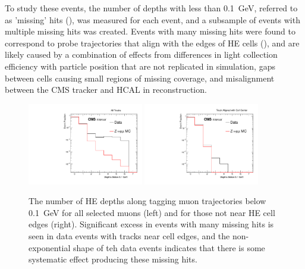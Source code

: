 To study these events, the number of depths with less than \SI{0.1}{\giga\eV}, referred to as 'missing' hits (), was measured for each event, and a subsample of events with multiple missing hits was created. 
Events with many missing hits were found to correspond to probe trajectories that align with the edges of HE cells (), and are likely caused by a combination of effects from differences in light collection efficiency with particle position that are not replicated in simulation, gaps between cells causing small regions of missing coverage, and misalignment between the CMS tracker and HCAL in reconstruction.

\begin{figure}[htbp]
	\centering
	\includegraphics[width=0.45\textwidth]{figures/hcalAllMissingHits.pdf}
        \hspace{0.01\textwidth}
        \includegraphics[width=0.45\textwidth]{figures/hcalMissingHits.pdf}
        \caption[Missing muon hits in HE]{The number of HE depths along tagging muon trajectories below \SI{0.1}{\giga\eV} for all selected muons (left) and for those not near HE cell edges (right). Significant excess in events with many missing hits is seen in data events with tracks near cell edges, and the non-exponential shape of teh data events indicates that there is some systematic effect producing these missing hits.}
        \label{fig:missingHits}
\end{figure}

